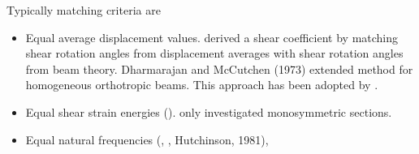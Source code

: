 Typically matching criteria are \parencite{nicholson1977timoshenko,steinboeck2013energyconsistent}
\begin{itemize}
\item Equal average displacement values.
\cite{cowper1966shear} derived a shear coefficient by matching shear rotation angles from displacement averages with shear rotation angles from beam theory. 
Dharmarajan and McCutchen (1973) extended \cite{cowper1966shear} method for homogeneous orthotropic beams. 
This approach has been adopted by \cite{cowper1966shear,simo1984numericala}. 

\item Equal shear strain energies (\cite{krenk1985pretwist,renton1991generalized,schramm1994shear}). \cite{gruttmann1999shear} only investigated monosymmetric sections.

\item Equal natural frequencies (\cite{timoshenko1922transverse}, \cite{kaneko1975timoshenkos}, Hutchinson, 1981),
\end{itemize}

